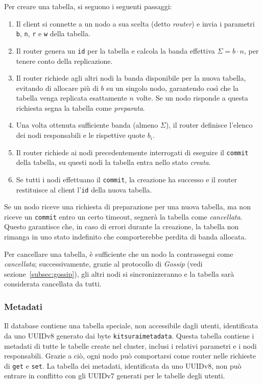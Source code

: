 Per creare una tabella, si seguono i seguenti passaggi:
\begin{enumerate}
    \item Il client si connette a un nodo a sua scelta (detto \emph{router}) e invia i parametri \texttt{b}, \texttt{n}, \texttt{r} e \texttt{w} della tabella.
    \item Il router genera un \texttt{id} per la tabella e calcola la banda effettiva $\Sigma = b \cdot n$, per tenere conto della replicazione.
    \item Il router richiede agli altri nodi la banda disponibile per la nuova tabella, evitando di allocare più di $b$ su un singolo nodo, garantendo così che la tabella venga replicata esattamente $n$ volte. Se un nodo risponde a questa richiesta segna la tabella come \emph{preparata}.
    \item Una volta ottenuta sufficiente banda (almeno $\Sigma$), il router definisce l'elenco dei nodi responsabili e le rispettive quote $b_i$.
    \item Il router richiede ai nodi precedentemente interrogati di eseguire il \texttt{commit} della tabella, su questi nodi la tabella entra nello stato \emph{creata}.
    \item Se tutti i nodi effettuano il \texttt{commit}, la creazione ha successo e il router restituisce al client l'\texttt{id} della nuova tabella.
\end{enumerate}

Se un nodo riceve una richiesta di preparazione per una nuova tabella, ma non riceve un \texttt{commit} entro un certo timeout, segnerà la tabella come \emph{cancellata}.
Questo garantisce che, in caso di errori durante la creazione, la tabella non rimanga in uno stato indefinito che comporterebbe perdita di banda allocata.

Per cancellare una tabella, è sufficiente che un nodo la contrassegni come \emph{cancellata}; successivamente, grazie al protocollo di \emph{Gossip} (vedi sezione~\ref{subsec:gossip}), gli altri nodi si sincronizzeranno e la tabella sarà considerata cancellata da tutti.

\subsubsection{Metadati}
\label{subsubsec:metadati}

Il database contiene una tabella speciale, non accessibile dagli utenti, identificata da uno UUIDv8 generato dai byte \texttt{kitsuraimetadata}.
Questa tabella contiene i metadati di tutte le tabelle create nel cluster, inclusi i relativi parametri e i nodi responsabili.
Grazie a ciò, ogni nodo può comportarsi come router nelle richieste di \texttt{get} e \texttt{set}.
La tabella dei metadati, identificata da uno UUIDv8, non può entrare in conflitto con gli UUIDv7 generati per le tabelle degli utenti.

